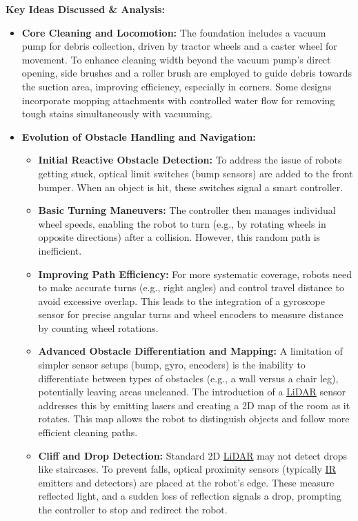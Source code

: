 \textbf{Key Ideas Discussed \& Analysis:}
\begin{itemize}
    \item \textbf{Core Cleaning and Locomotion:} The foundation includes a vacuum pump for debris collection, driven by tractor wheels and a caster wheel for movement. To enhance cleaning width beyond the vacuum pump's direct opening, side brushes and a roller brush are employed to guide debris towards the suction area, improving efficiency, especially in corners. Some designs incorporate mopping attachments with controlled water flow for removing tough stains simultaneously with vacuuming.
    \item \textbf{Evolution of Obstacle Handling and Navigation:}
        \begin{itemize}
            \item \textbf{Initial Reactive Obstacle Detection:} To address the issue of robots getting stuck, optical limit switches (bump sensors) are added to the front bumper. When an object is hit, these switches signal a smart controller.
            \item \textbf{Basic Turning Maneuvers:} The controller then manages individual wheel speeds, enabling the robot to turn (e.g., by rotating wheels in opposite directions) after a collision. However, this random path is inefficient.
            \item \textbf{Improving Path Efficiency:} For more systematic coverage, robots need to make accurate turns (e.g., right angles) and control travel distance to avoid excessive overlap. This leads to the integration of a gyroscope sensor for precise angular turns and wheel encoders to measure distance by counting wheel rotations.
            \item \textbf{Advanced Obstacle Differentiation and Mapping:} A limitation of simpler sensor setups (bump, gyro, encoders) is the inability to differentiate between types of obstacles (e.g., a wall versus a chair leg), potentially leaving areas uncleaned. The introduction of a \hyperref[term:lidar]{LiDAR} sensor addresses this by emitting lasers and creating a 2D map of the room as it rotates. This map allows the robot to distinguish objects and follow more efficient cleaning paths.
            \item \textbf{Cliff and Drop Detection:} Standard 2D \hyperref[term:lidar]{LiDAR} may not detect drops like staircases. To prevent falls, optical proximity sensors (typically \hyperref[term:ir]{IR} emitters and detectors) are placed at the robot's edge. These measure reflected light, and a sudden loss of reflection signals a drop, prompting the controller to stop and redirect the robot.

\end{itemize}
\end{itemize}
